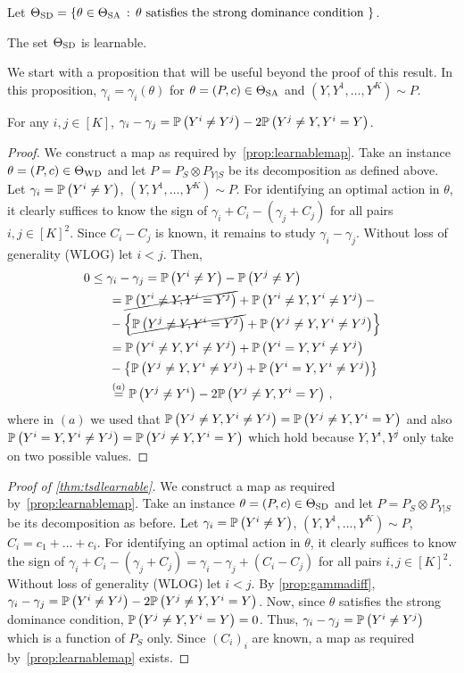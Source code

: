 Let $\Theta_{\mathrm{SD}} = \{ \theta\in \Theta_{\mathrm{SA}}\,:\, \theta \text{ satisfies the strong dominance condition } \}$.
\begin{thm}
\label{thm:tsdlearnable}
The set $\Theta_{\mathrm{SD}}$ is learnable.
\end{thm}
We start with a proposition that will be useful beyond the proof of this result.
In this proposition, $\gamma_i = \gamma_i(\theta)$ for $\theta=(P,c)\in \Theta_{\mathrm{SA}}$ and $(Y,Y^1,\dots,Y^K) \sim P$.
\begin{prop}\label{prop:gammadiff}
For any $i,j\in [K]$, $\gamma_i - \gamma_j = \mathbb{P}\left(Y^i\ne Y^j\right) - 2\mathbb{P}\left( Y^j \ne Y, Y^i=Y\right)$.
\end{prop}
\begin{proof}

We construct a map as required by~\cref{prop:learnablemap}.
Take an instance $\theta = (P,c)\in \Theta_{\mathrm{WD}}$ and let $P = P_S \otimes P_{Y|S}$ be its decomposition
as defined above.
Let $\gamma_i = \mathbb{P}\left(Y^i \ne Y\right)$, $(Y,Y^1,\dots,Y^K)\sim P$.
For identifying an optimal action in $\theta$, it clearly suffices
to know the sign of $\gamma_i + C_i - (\gamma_j +C_j)$ for all pairs $i,j\in [K]^2$.
Since $C_i - C_j$ is known, it remains to study $\gamma_i-\gamma_j$.
Without loss of generality (WLOG) let $i<j$.
Then, 
\begin{align*}
\MoveEqLeft 0  \le \gamma_i  - \gamma_j = \Prob{Y^i\ne Y} - \Prob{Y^j\ne Y} \\
& = \cancel{\Prob{Y^i\ne Y, Y^i=Y^j}} + \Prob{ Y^i\ne Y, Y^i\ne Y^j } - \\
& - \left\{ 
       \cancel{\Prob{Y^j\ne Y, Y^i=Y^j}} + \Prob{ Y^j\ne Y, Y^i\ne Y^j }\right\}\\
& = \Prob{ Y^i\ne Y, Y^i \ne Y^j } + \Prob{Y^i=Y,Y^i\ne Y^j}       \\
& - \left\{ 
	  \Prob{ Y^j \ne Y, Y^i\ne Y^j } + \Prob{ Y^i=Y,Y^i\ne Y^j}
	 \right\}\\
& \stackrel{\footnotesize (a)}{=} \Prob{ Y^j \ne Y^i } -2 \Prob{ Y^j\ne Y, Y^i = Y }\,,
\end{align*}
where in $(a)$ we used that $\mathbb{P}\left( Y^j \ne Y, Y^i\ne Y^j \right) =  \mathbb{P}\left( Y^j\ne Y,Y^i= Y\right)$ and also
$\mathbb{P}\left( Y^i=Y,Y^i\ne Y^j\right) = \mathbb{P}\left( Y^j\ne Y,Y^i= Y\right)$
which hold because $Y,Y^i,Y^j$ only take on two possible values.
\end{proof}
\begin{proof}[Proof of \cref{thm:tsdlearnable}]
We construct a map as required by~\cref{prop:learnablemap}.
Take an instance $\theta = (P,c)\in \Theta_{\mathrm{SD}}$ and let $P = P_S \otimes P_{Y|S}$ be its decomposition as before.
Let $\gamma_i = \mathbb{P}\left(Y^i \ne Y\right)$, $(Y,Y^1,\dots,Y^K)\sim P$, $C_i = c_1+\dots+c_i$.
For identifying an optimal action in $\theta$, it clearly suffices
to know the sign of $\gamma_i + C_i - (\gamma_j +C_j) = \gamma_i-\gamma_j + (C_i-C_j)$ for all pairs $i,j\in [K]^2$.
Without loss of generality (WLOG) let $i<j$. By \cref{prop:gammadiff},
$\gamma_i - \gamma_j = \mathbb{P}\left( Y^i \ne Y^j \right) -2 \mathbb{P}\left( Y^j\ne Y, Y^i = Y \right)$.
Now, since $\theta$ satisfies the strong dominance condition, $ \mathbb{P}\left( Y^j\ne Y, Y^i = Y \right) = 0$.
Thus, $\gamma_i - \gamma_j = \mathbb{P}\left( Y^i \ne Y^j \right)$
which is a function of $P_S$ only.
Since $(C_i)_i$ are known, a map as required by~\cref{prop:learnablemap} exists.
\end{proof}
